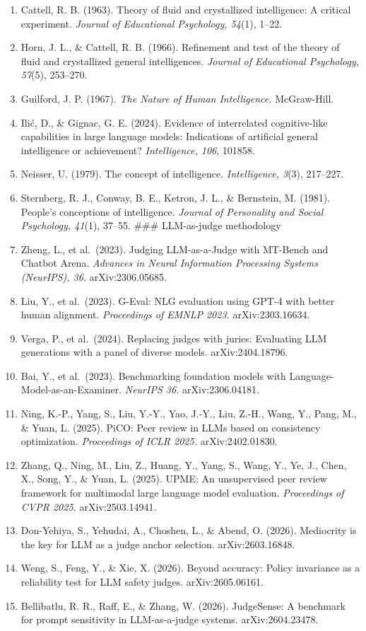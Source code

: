 \begin{enumerate}
\def\labelenumi{\arabic{enumi}.}
\setcounter{enumi}{10}
\item
  Cattell, R. B. (1963). Theory of fluid and crystallized intelligence: A critical experiment. \emph{Journal of Educational Psychology, 54}(1), 1--22.
\item
  Horn, J. L., \& Cattell, R. B. (1966). Refinement and test of the theory of fluid and crystallized general intelligences. \emph{Journal of Educational Psychology, 57}(5), 253--270.
\item
  Guilford, J. P. (1967). \emph{The Nature of Human Intelligence.} McGraw-Hill.
\item
  Ilić, D., \& Gignac, G. E. (2024). Evidence of interrelated cognitive-like capabilities in large language models: Indications of artificial general intelligence or achievement? \emph{Intelligence, 106}, 101858.
\item
  Neisser, U. (1979). The concept of intelligence. \emph{Intelligence, 3}(3), 217--227.
\item
  Sternberg, R. J., Conway, B. E., Ketron, J. L., \& Bernstein, M. (1981). People's conceptions of intelligence. \emph{Journal of Personality and Social Psychology, 41}(1), 37--55. \#\#\# LLM-as-judge methodology
\item
  Zheng, L., et al.~(2023). Judging LLM-as-a-Judge with MT-Bench and Chatbot Arena. \emph{Advances in Neural Information Processing Systems (NeurIPS), 36.} arXiv:2306.05685.
\item
  Liu, Y., et al.~(2023). G-Eval: NLG evaluation using GPT-4 with better human alignment. \emph{Proceedings of EMNLP 2023.} arXiv:2303.16634.
\item
  Verga, P., et al.~(2024). Replacing judges with juries: Evaluating LLM generations with a panel of diverse models. arXiv:2404.18796.
\item
  Bai, Y., et al.~(2023). Benchmarking foundation models with Language-Model-as-an-Examiner. \emph{NeurIPS 36.} arXiv:2306.04181.
\item
  Ning, K.-P., Yang, S., Liu, Y.-Y., Yao, J.-Y., Liu, Z.-H., Wang, Y., Pang, M., \& Yuan, L. (2025). PiCO: Peer review in LLMs based on consistency optimization. \emph{Proceedings of ICLR 2025.} arXiv:2402.01830.
\item
  Zhang, Q., Ning, M., Liu, Z., Huang, Y., Yang, S., Wang, Y., Ye, J., Chen, X., Song, Y., \& Yuan, L. (2025). UPME: An unsupervised peer review framework for multimodal large language model evaluation. \emph{Proceedings of CVPR 2025.} arXiv:2503.14941.
\item
  Don-Yehiya, S., Yehudai, A., Choshen, L., \& Abend, O. (2026). Mediocrity is the key for LLM as a judge anchor selection. arXiv:2603.16848.
\item
  Weng, S., Feng, Y., \& Xie, X. (2026). Beyond accuracy: Policy invariance as a reliability test for LLM safety judges. arXiv:2605.06161.
\item
  Bellibatlu, R. R., Raff, E., \& Zhang, W. (2026). JudgeSense: A benchmark for prompt sensitivity in LLM-as-a-judge systems. arXiv:2604.23478.
\end{enumerate}

